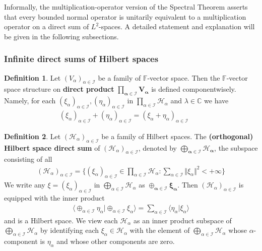 \documentclass[12pt,b5paper,notitlepage]{article}
\theoremstyle{definition}
\newtheorem{df}{Definition}[subsection]
\theoremstyle{plain}
\newcommand{\bk}[1]{\langle {#1}\rangle}
\newcommand{\bigbk}[1]{\big\langle {#1}\big\rangle}
\newcommand{\Cbb}{\mathbb C}
\newcommand{\Fbb}{\mathbb F}
\newcommand{\MH}{\mathcal H}
\newcommand{\SI}{\mathscr I}
\numberwithin{equation}{section}
\begin{document}
Informally, the multiplication-operator version of the Spectral Theorem asserts that every bounded normal operator is unitarily equivalent to a multiplication operator on a direct sum of $L^2$-spaces. A detailed statement and explanation will be given in the following subsections.


\subsubsection{Infinite direct sums of Hilbert spaces}

\begin{df}
Let $(V_\alpha)_{\alpha\in\SI}$ be a family of $\Fbb$-vector space. Then the $\Fbb$-vector space structure on \textbf{direct product}  $\pmb{\prod_{\alpha\in\SI}V_\alpha}$ is defined componentwisely. Namely, for each $(\xi_\alpha)_{\alpha\in\SI},(\eta_\alpha)_{\alpha\in\SI}$ in $\prod_{\alpha\in\SI}\MH_\alpha$ and $\lambda\in\Cbb$ we have
\begin{align*}
(\xi_\alpha)_{\alpha\in\SI}+(\eta_\alpha)_{\alpha\in\SI}=(\xi_\alpha+\eta_\alpha)_{\alpha\in\SI}\qquad 
\end{align*}
\end{df}






\begin{df}
Let $(\MH_\alpha)_{\alpha\in\SI}$ be a family of Hilbert spaces. The \textbf{(orthogonal) Hilbert space direct sum}  of $(\MH_\alpha)_{\alpha\in\SI}$, denoted by $\pmb{\bigoplus_{\alpha\in\SI}\MH_\alpha}$, the subspace consisting of all
\begin{align*}
(\MH_\alpha)_{\alpha\in\SI}=\Big\{(\xi_\alpha)_{\alpha\in\SI}\in\prod_{\alpha\in\SI}\MH_\alpha:\sum_{\alpha\in\SI}\Vert\xi_\alpha\Vert^2<+\infty\Big\}
\end{align*}
We write any $\xi=(\xi_\alpha)_{\alpha\in\SI}$ in $\bigoplus_{\alpha\in\SI}\MH_\alpha$ as $\pmb{\oplus_{\alpha\in\SI}\xi_\alpha}$. Then $(\MH_\alpha)_{\alpha\in\SI}$ is equipped with the inner product
\begin{align}\label{eq171}
\bigbk{\oplus_{\alpha\in\SI}\eta_\alpha\big|\oplus_{\alpha\in\SI}\xi_\alpha }=\sum_{\alpha\in\SI}\bk{\eta_\alpha|\xi_\alpha}
\end{align}
and is a Hilbert space. We view each $\MH_\alpha$ as an inner product subspace of $\bigoplus_{\alpha\in\SI}\MH_\alpha$ by identifying each $\xi_\alpha\in\MH_\alpha$ with the element of $\bigoplus_{\alpha\in\SI}\MH_\alpha$ whose $\alpha$-component is $\eta_\alpha$ and whose other components are zero.
\end{df}
\end{document}

